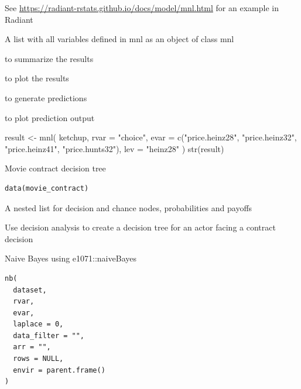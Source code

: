 \documentclass[a4paper]{book}
\begin{document}
%
\begin{Details}
See \url{https://radiant-rstats.github.io/docs/model/mnl.html} for an example in Radiant
\end{Details}
%
\begin{Value}
A list with all variables defined in mnl as an object of class mnl
\end{Value}
%
\begin{SeeAlso}
 to summarize the results

 to plot the results

 to generate predictions

 to plot prediction output
\end{SeeAlso}
%
\begin{Examples}
\begin{ExampleCode}
result <- mnl(
  ketchup,
  rvar = "choice",
  evar = c("price.heinz28", "price.heinz32", "price.heinz41", "price.hunts32"),
  lev = "heinz28"
)
str(result)

\end{ExampleCode}
\end{Examples}
%
\begin{Description}
Movie contract decision tree
\end{Description}
%
\begin{Usage}
\begin{verbatim}
data(movie_contract)
\end{verbatim}
\end{Usage}
%
\begin{Format}
A nested list for decision and chance nodes, probabilities and payoffs
\end{Format}
%
\begin{Details}
Use decision analysis to create a decision tree for an actor facing a contract decision
\end{Details}
%
\begin{Description}
Naive Bayes using e1071::naiveBayes
\end{Description}
%
\begin{Usage}
\begin{verbatim}
nb(
  dataset,
  rvar,
  evar,
  laplace = 0,
  data_filter = "",
  arr = "",
  rows = NULL,
  envir = parent.frame()
)
\end{verbatim}
\end{Usage}
\end{document}
